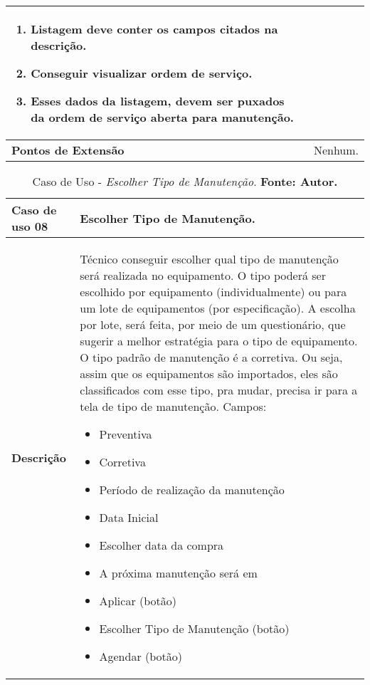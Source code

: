 \begin{apendicesenv}
\begin{table}[H]
\begin{tabular}{ | p{5cm} | p{10cm} |  }
\begin{enumerate}
									\item Listagem deve conter os campos citados na descrição.
									\item Conseguir visualizar ordem de serviço.
									\item Esses dados da listagem, devem ser puxados da ordem de serviço aberta para manutenção.
								 \end{enumerate}   \\ \hline
	\textbf{Pontos de Extensão} & Nenhum. \\ \hline
\end{tabular}
\end{table}


\begin{table}[H]
\centering
\caption{Caso de Uso - \textit{Escolher Tipo de Manutenção}. \textbf{Fonte: Autor.}}
\label{uc08}
\begin{tabular}{ | p{3cm} | p{13cm} |  }
\hline
	\textbf{Caso de uso 08} & Escolher Tipo de Manutenção. \\ \hline
	\textbf{Descrição} & Técnico conseguir escolher qual tipo de manutenção será realizada no equipamento. O tipo poderá ser escolhido por equipamento (individualmente) ou para um lote de equipamentos (por especificação). A escolha por lote, será feita, por meio de um questionário, que sugerir a melhor estratégia para o tipo de equipamento. O tipo padrão de manutenção é a corretiva. Ou seja, assim que os equipamentos são importados, eles são classificados com esse tipo, pra mudar, precisa ir para a tela de tipo de manutenção. Campos: \begin{itemize}
															                    \item Preventiva
															                    \item Corretiva
															                    \item Período de realização da manutenção
															                    \item Data Inicial 
															                    \item Escolher data da compra
															                    \item A próxima manutenção será em
															                    \item Aplicar (botão)
															                    \item Escolher Tipo de Manutenção (botão)
															                    \item Agendar (botão)

\end{itemize}
\end{tabular}
\end{table}
\end{apendicesenv}
